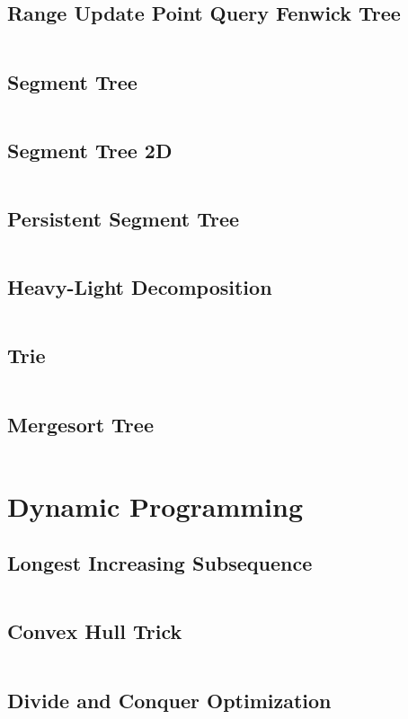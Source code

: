 \documentclass[a4paper, 10pt, twocolumn, landscape]{article}
\begin{document}
  \subsection{Range Update Point Query Fenwick Tree}
  \inputminted{cpp}{data-structures/bit-range.cpp}
  \subsection{Segment Tree}
  \inputminted{cpp}{data-structures/segtree.cpp}
  \subsection{Segment Tree 2D}
  \inputminted{cpp}{data-structures/segtree2d.cpp}
  \subsection{Persistent Segment Tree}
  \inputminted{cpp}{data-structures/persistent-segtree.cpp}
  \subsection{Heavy-Light Decomposition}
  \inputminted{cpp}{data-structures/hld.cpp}
  \subsection{Trie}
  \inputminted{cpp}{data-structures/trie.cpp}
  \subsection{Mergesort Tree}
  \inputminted{cpp}{data-structures/mergesort-tree.cpp}

  \section{Dynamic Programming}
  \subsection{Longest Increasing Subsequence}
  \inputminted{cpp}{dynamic-programming/lis.cpp}
  \subsection{Convex Hull Trick}
  \inputminted{cpp}{dynamic-programming/convex-hull-trick.cpp}
  \subsection{Divide and Conquer Optimization}
  \inputminted{cpp}{dynamic-programming/divide-and-conquer-optimization.cpp}
\end{document}
